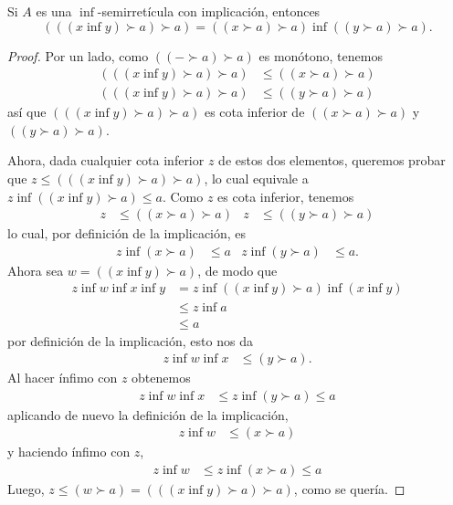 \begin{lemma}
  \label{lemma:modalidad-w}
  Si $A$ es una $\inf$-semirretícula con implicación, entonces
  \[
    (((x\inf y)\succ a)\succ a)
    =
    ((x\succ a)\succ a) \inf
    ((y\succ a)\succ a)
  .\]
\end{lemma}
\begin{proof}
  Por un lado, como $((-\succ a)\succ a)$ es monótono, tenemos
  \begin{align*}
    (((x\inf y)\succ a)\succ a)
    &\leq ((x\succ a)\succ a)
    \\
    (((x\inf y)\succ a)\succ a)
    &\leq ((y\succ a)\succ a)
  \end{align*}
  así que $(((x\inf y)\succ a)\succ a)$ es cota inferior de
  $((x\succ a)\succ a)$ y $((y\succ a)\succ a)$.

  Ahora, dada cualquier cota inferior $z$ de estos dos elementos,
  queremos probar que $z \leq (((x\inf y)\succ a)\succ a)$,
  lo cual equivale a $z\inf((x\inf y)\succ a)\leq a$.
  Como $z$ es cota inferior, tenemos
  \begin{align*}
    z&\leq ((x\succ a)\succ a)
    &
    z&\leq ((y\succ a)\succ a)
  \end{align*}
  lo cual, por definición de la implicación, es
  \begin{align*}
    z\inf (x\succ a) &\leq a
    &
    z\inf (y\succ a) &\leq a.
  \end{align*}
  Ahora sea $w=((x\inf y)\succ a)$, de modo que
  \begin{align*}
    z\inf w\inf x\inf y
    &= z\inf ((x\inf y)\succ a)\inf(x\inf y) \\
    &\leq z\inf a \\
    &\leq a
  \end{align*}
  por definición de la implicación, esto nos da
  \begin{align*}
    z\inf w \inf x &\leq (y\succ a).
  \end{align*}
  Al hacer ínfimo con $z$ obtenemos
  \begin{align*}
    z\inf w \inf x
    &\leq z\inf (y\succ a) \leq a
  \end{align*}
  aplicando de nuevo la definición de la implicación,
  \begin{align*}
    z\inf w &\leq (x\succ a)
  \end{align*}
  y haciendo ínfimo con $z$,
  \begin{align*}
    z\inf w &\leq z\inf (x\succ a) \leq a
  \end{align*}
  Luego, $z\leq (w\succ a)=(((x\inf y)\succ a)\succ a)$,
  como se quería.
\end{proof}

